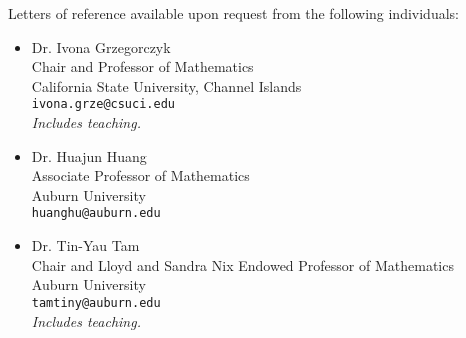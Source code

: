 \documentclass[11pt]{article}
\begin{document}

\makeletterhead

\maketitle

Letters of reference available upon request from the following
individuals:

\begin{itemize}
  \item{} Dr. Ivona Grzegorczyk\\
          Chair and Professor of Mathematics\\
          California State University, Channel Islands\\
          \texttt{ivona.grze@csuci.edu}\\
          \emph{Includes teaching.}
  \item{} Dr. Huajun Huang\\
          Associate Professor of Mathematics\\
          Auburn University\\
          \texttt{huanghu@auburn.edu}
  \item{} Dr. Tin-Yau Tam\\
          Chair and Lloyd and Sandra Nix Endowed
          Professor of Mathematics\\
          Auburn University\\
          \texttt{tamtiny@auburn.edu}\\
          \emph{Includes teaching.}
\end{itemize}

\label{page:last}
\end{document}
